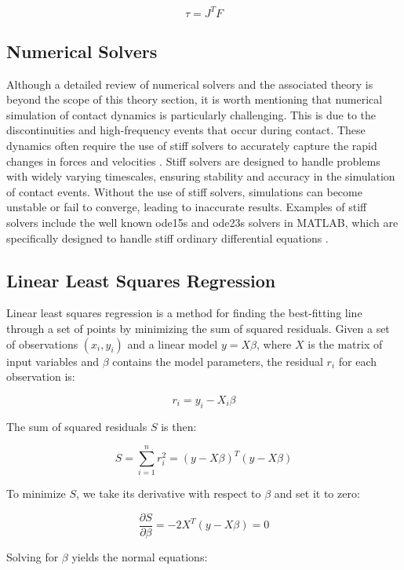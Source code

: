     \begin{equation}
        \label{eq:force_torque_mapping}
        \tau = J^T F
    \end{equation}

\subsection{Numerical Solvers}
\label{sec:numerical_solvers}

Although a detailed review of numerical solvers and the associated theory is beyond the scope of this theory section, it is worth mentioning that numerical simulation of contact dynamics is particularly challenging. This is due to the discontinuities and high-frequency events that occur during contact. These dynamics often require the use of stiff solvers to accurately capture the rapid changes in forces and velocities \cite{stiff_contact_ODE_1}\cite{stiff_contact_ODE_2}. Stiff solvers are designed to handle problems with widely varying timescales, ensuring stability and accuracy in the simulation of contact events. Without the use of stiff solvers, simulations can become unstable or fail to converge, leading to inaccurate results. Examples of stiff solvers include the well known ode15s and ode23s solvers in MATLAB, which are specifically designed to handle stiff ordinary differential equations \cite{MATLAB_ODE}. 



\subsection{Linear Least Squares Regression}
Linear least squares regression is a method for finding the best-fitting line through a set of points by minimizing the sum of squared residuals. Given a set of observations \((x_i, y_i)\) and a linear model \(y = X\beta\), where \(X\) is the matrix of input variables and \(\beta\) contains the model parameters, the residual \(r_i\) for each observation is:

\[
r_i = y_i - X_i\beta
\]

The sum of squared residuals \(S\) is then:

\[
S = \sum_{i=1}^n r_i^2 = (y - X\beta)^T(y - X\beta)
\]

To minimize \(S\), we take its derivative with respect to \(\beta\) and set it to zero:

\[
\frac{\partial S}{\partial \beta} = -2X^T(y - X\beta) = 0
\]

Solving for \(\beta\) yields the normal equations:


